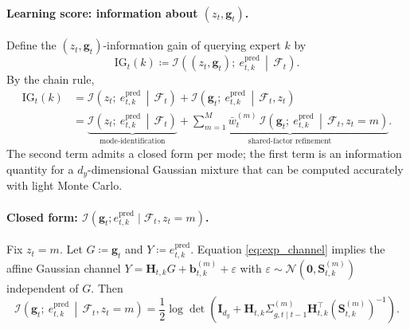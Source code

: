 \paragraph{Learning score: information about \((z_t,\mathbf{g}_t)\).}
Define the \((z_t,\mathbf{g}_t)\)-information gain of querying expert \(k\) by
\begin{equation}
\label{eq:exp_ig_zg_def}
\mathrm{IG}_t(k)
\coloneqq
\mathcal{I}\!\left((z_t,\mathbf{g}_t);\ e_{t,k}^{\mathrm{pred}}\,\middle|\,\mathcal{F}_t\right).
\end{equation}
By the chain rule,
\begin{align}
\label{eq:exp_ig_zg_chain}
\mathrm{IG}_t(k)
&=
\mathcal{I}\!\left(z_t;\ e_{t,k}^{\mathrm{pred}}\,\middle|\,\mathcal{F}_t\right)
+
\mathcal{I}\!\left(\mathbf{g}_t;\ e_{t,k}^{\mathrm{pred}}\,\middle|\,\mathcal{F}_t,z_t\right)\\
&=
\underbrace{\mathcal{I}\!\left(z_t;\ e_{t,k}^{\mathrm{pred}}\,\middle|\,\mathcal{F}_t\right)}_{\text{mode-identification}}
+
\underbrace{\sum_{m=1}^M \bar{w}_t^{(m)}\,
\mathcal{I}\!\left(\mathbf{g}_t;\ e_{t,k}^{\mathrm{pred}}\,\middle|\,\mathcal{F}_t,z_t=m\right)}_{\text{shared-factor refinement}}.
\end{align}
The second term admits a closed form per mode; the first term is an information quantity for a
\(d_y\)-dimensional Gaussian mixture that can be computed accurately with light Monte Carlo.

\paragraph{Closed form: \(\mathcal{I}(\mathbf{g}_t;e_{t,k}^{\mathrm{pred}}\mid \mathcal{F}_t,z_t=m)\).}
Fix \(z_t=m\).
Let \(G\coloneqq \mathbf{g}_t\) and \(Y\coloneqq e_{t,k}^{\mathrm{pred}}\).
Equation \eqref{eq:exp_channel} implies the affine Gaussian channel
\(
Y=\mathbf{H}_{t,k}G+\mathbf{b}^{(m)}_{t,k}+\varepsilon
\)
with \(\varepsilon\sim\mathcal{N}(\mathbf{0},\mathbf{S}^{(m)}_{t,k})\) independent of \(G\).
Then
\begin{equation}
\label{eq:exp_ig_g_mode}
\mathcal{I}\!\left(\mathbf{g}_t;\ e_{t,k}^{\mathrm{pred}}\,\middle|\,\mathcal{F}_t,z_t=m\right)
=
\frac12\log\det\!\left(\mathbf{I}_{d_y}+\mathbf{H}_{t,k}\Sigma^{(m)}_{g,t\mid t-1}\mathbf{H}_{t,k}^\top(\mathbf{S}^{(m)}_{t,k})^{-1}\right).
\end{equation}


